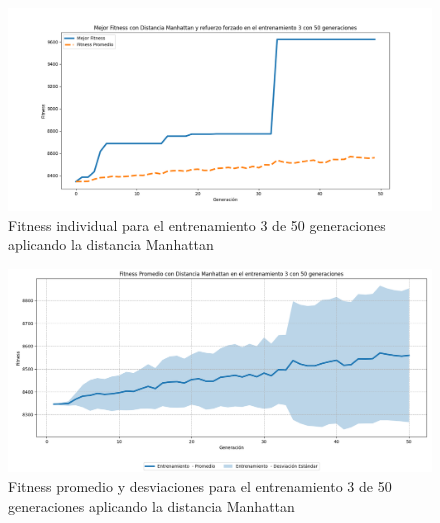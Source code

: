\documentclass[conference]{IEEEtran}
\begin{document}
\begin{figure}
    \centering
    \includegraphics[width=0.9 \linewidth]{Manhattan/Fitness_individual_50Gen/Fitness_3_Manh_50Gen.png}
    \caption{Fitness individual para el entrenamiento 3 de 50 generaciones aplicando la distancia Manhattan}
    \label{fig:manhattan_3_50}
\end{figure}
\begin{figure}
    \centering
    \includegraphics[width=0.9 \linewidth]{Manhattan/Fitness_individual_50Gen/Fitness_3_Manh_50Gen_Sombra.png} 
    \caption{Fitness promedio y desviaciones para el entrenamiento 3 de 50 generaciones aplicando la distancia Manhattan}
    \label{fig:manhattan_3_50_sombra}
\end{figure}
\end{document}
